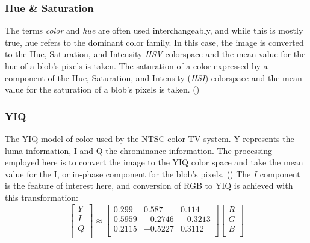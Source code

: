 \documentclass[letterpaper]{article}
\begin{document}
{\subsubsection{Hue \& Saturation}
The terms {\it color} and {\it hue} are often used interchangeably, and while this is mostly true, hue refers to the dominant color family. In this case, the image is converted to the Hue, Saturation, and Intensity {\it HSV} colorspace and the mean value for the hue of a blob's pixels is taken. The saturation of a color expressed by a component of the Hue, Saturation, and Intensity ({\it HSI}) colorspace and the mean value for the saturation of a blob's pixels is taken. (\cite{Forsyth2012-hy})

\subsubsection{YIQ}
The YIQ model of color used by the NTSC color TV system. Y represents the luma information, I and Q the chrominance information. The processing employed here is to convert the image to the YIQ color space and take the mean value for the I, or in-phase component for the blob's pixels. (\cite{MathWorks_undated-jg})
The $I$ component is the feature of interest here, and conversion of RGB to YIQ is achieved with this transformation:
\begin{equation}
	\begin{bmatrix}
	Y \\[0.3em]
	I \\[0.3em]
	Q \\[0.3em]
	\end{bmatrix}
	\approx
	\begin{bmatrix}
	0.299 & 0.587 & 0.114 \\[0.3em]
	0.5959 & -0.2746 & -0.3213\\[0.3em]
	0.2115 & -0.5227 & 0.3112 \\[0.3em]
	\end{bmatrix}
	\begin{bmatrix}
	R \\[0.3em]
	G \\[0.3em]
	B \\[0.3em]
	\end{bmatrix}	
\end{equation}

}
\end{document}
